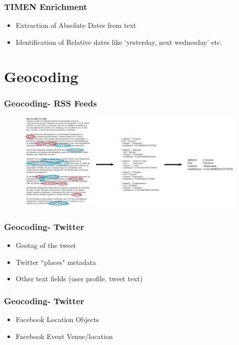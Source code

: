 \documentclass{beamer}
\begin{document}
\begin{frame}
\frametitle{TIMEN Enrichment}
    \begin{itemize}
        \item
            Extraction of Absolute Dates from text
        \item
            Identification of Relative dates like `yesterday, next wednesday' etc.
    \end{itemize}
\end{frame}

\section{Geocoding}
\begin{frame}
\frametitle{Geocoding- RSS Feeds}
\begin{figure}
    \centering
    \includegraphics[width=\textwidth]{psl_pipeline2}
\end{figure}
\end{frame}

\begin{frame}
\frametitle{Geocoding- Twitter}
    \begin{itemize}
        \item
            Geotag of the tweet
        \item
            Twitter ``places" metadata
        \item
            Other text fields (user profile, tweet text)
    \end{itemize}
\end{frame}

\begin{frame}
\frametitle{Geocoding- Twitter}
    \begin{itemize}
        \item
            Facebook Location Objects
        \item
            Facebook Event Venue/location
    \end{itemize}
\end{frame}
\end{document}
